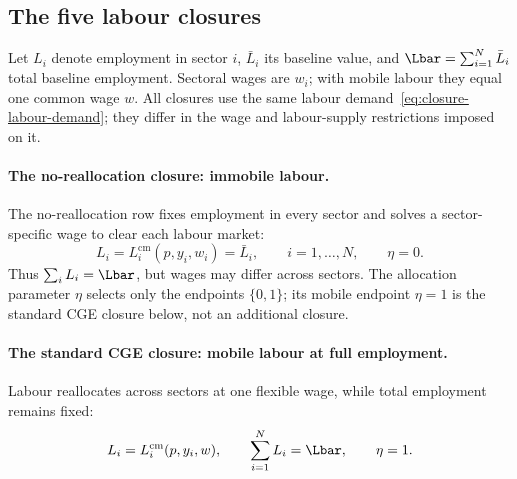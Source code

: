 \subsection{The five labour closures}\label{app:labour-closures}

Let $L_i$ denote employment in sector $i$, $\bar{L}_i$ its baseline value,
and $\Lbar = \sum_{i=1}^N \bar{L}_i$ total baseline employment. Sectoral
wages are $w_i$; with mobile labour they equal one common wage $w$. All
closures use the same labour demand~\eqref{eq:closure-labour-demand}; they
differ in the wage and labour-supply restrictions imposed on it.

\paragraph{The no-reallocation closure: immobile labour.}
The no-reallocation row fixes employment in every sector and solves a
sector-specific wage to clear each labour market:
\begin{equation}
L_i = L_i^{\mathrm{cm}}(p,y_i,w_i) = \bar{L}_i,
\qquad i=1,\ldots,N, \qquad \eta = 0.
\label{eq:closure-bf}
\end{equation}
Thus $\sum_i L_i = \Lbar$, but wages may differ across sectors.
The allocation parameter $\eta$ selects only the endpoints $\{0,1\}$;
its mobile endpoint $\eta = 1$ is the standard CGE closure below, not an
additional closure.

\paragraph{The standard CGE closure: mobile labour at full employment.}
Labour reallocates across sectors at one flexible wage, while total
employment remains fixed:
\begin{equation}
L_i = L_i^{\mathrm{cm}}(p,y_i,w),
\qquad \sum_{i=1}^N L_i = \Lbar,
\qquad \eta = 1.
\label{eq:closure-alpha}
\end{equation}

